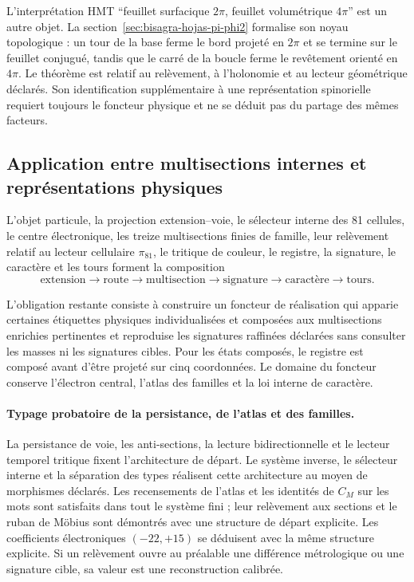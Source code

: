 L'interprétation HMT ``feuillet surfacique \(2\pi\), feuillet volumétrique \(4\pi\)'' est
un autre objet. La section~\ref{sec:bisagra-hojas-pi-phi2} formalise son noyau
topologique : un tour de la base ferme le bord projeté en \(2\pi\) et
se termine sur le feuillet conjugué, tandis que le carré de la boucle ferme le revêtement
orienté en \(4\pi\). Le théorème est relatif au relèvement, à l'holonomie et au
lecteur géométrique déclarés. Son identification supplémentaire à une
représentation spinorielle requiert toujours le foncteur physique et ne se déduit pas
du partage des mêmes facteurs.

\subsection{Application entre multisections internes et représentations physiques}

L'objet particule, la projection
extension--voie, le sélecteur interne des 81 cellules, le centre électronique,
les treize multisections finies de famille, leur relèvement relatif au lecteur
cellulaire \(\pi_{81}\), le tritique de couleur, le registre, la signature, le caractère et
les tours forment la composition
\[
\text{extension}\longrightarrow\text{route}\longrightarrow
\text{multisection}\longrightarrow\text{signature}\longrightarrow
\text{caractère}\longrightarrow\text{tours}.
\]

L'obligation restante consiste à construire un foncteur de
réalisation qui apparie certaines étiquettes physiques individualisées et
composées aux multisections enrichies pertinentes et reproduise les
signatures raffinées déclarées sans consulter les masses ni les signatures cibles. Pour les
états composés, le registre est composé avant d'être projeté sur cinq
coordonnées. Le domaine du foncteur conserve l'électron central, l'atlas des
familles et la loi interne de caractère.


\paragraph{Typage probatoire de la persistance, de l'atlas et des familles.}
La persistance de voie, les anti-sections, la lecture bidirectionnelle et le
lecteur temporel tritique fixent l'architecture de départ. Le système
inverse, le sélecteur interne et la séparation des types réalisent cette
architecture au moyen de morphismes déclarés. Les recensements de l'atlas et les
identités de \(C_M\) sur les mots sont satisfaits dans tout le système fini ;
leur relèvement aux sections et le ruban de Möbius sont démontrés avec une
structure de départ explicite. Les coefficients électroniques
\((-22,+15)\) se déduisent avec la même structure explicite. Si un
relèvement ouvre au préalable une différence métrologique ou une signature cible,
sa valeur est une reconstruction calibrée.
